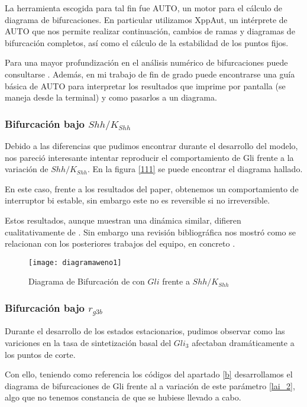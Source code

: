 La herramienta escogida para tal fin  fue AUTO, un motor para el cálculo de diagrama de bifurcaciones. En particular utilizamos XppAut, un intérprete de AUTO que nos permite realizar continuación, cambios de ramas y diagramas de bifurcación completos, así como el cálculo de la estabilidad de los puntos fijos. 

Para una mayor profundización en el análisis numérico de bifurcaciones puede consultarse \cite{meijer2012numerical}. Además, en mi trabajo de fin de grado \cite{Yo} puede encontrarse una guía básica de AUTO para interpretar los resultados que imprime por pantalla (se maneja desde la terminal) y como pasarlos a un diagrama. 


\subsubsection{Bifurcación bajo $Shh/K_{Shh}$}
Debido a las diferencias que pudimos encontrar durante el desarrollo del modelo, nos pareció interesante intentar reproducir el comportamiento de Gli frente a la variación de $Shh/K_{Shh}$.  En la figura \ref{111} se puede encontrar el diagrama hallado.

En este caso, frente a los resultados del paper, obtenemos un comportamiento de interruptor bi estable, sin embargo este no es reversible si no irreversible. 

Estos resultados, aunque muestran una dinámica similar, difieren cualitativamente de \cite{schaffer}. Sin embargo una revisión bibliográfica nos mostró como se relacionan con los posteriores trabajos del equipo, en concreto \cite{saha}.
\begin{figure}[h]
	\texttt{[image: diagramaweno1]}
	\centering
	\caption{Diagrama de Bifurcación de \cite{schaffer} con $Gli$ frente a $Shh/K_{Shh}$}
	\label{lai_12}
\end{figure}



\subsubsection{Bifurcación bajo $r_{g3b}$}
Durante el desarrollo de los estados estacionarios, pudimos observar como las variciones en la tasa de sintetización basal del $Gli_3$ afectaban dramáticamente a los puntos de corte.

 Con ello, teniendo como referencia los códigos del apartado \ref{b} desarrollamos el diagrama de bifurcaciones de Gli frente al a variación de este parámetro \ref{lai_2}, algo que no tenemos constancia de que se hubiese llevado a cabo.

